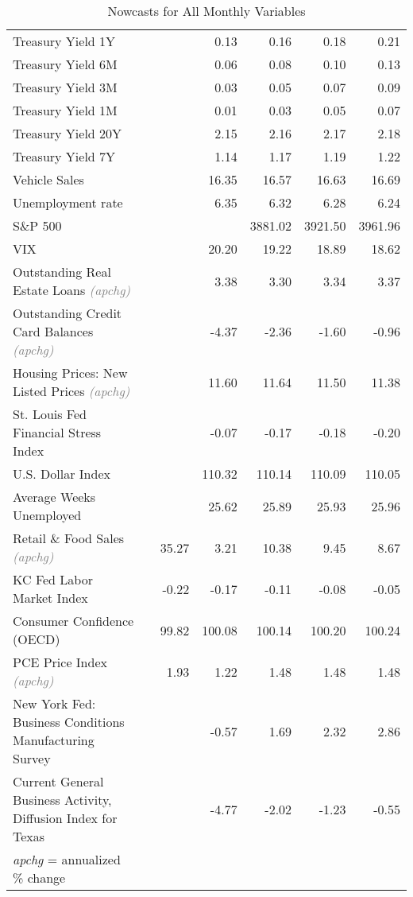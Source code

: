 \documentclass[11pt, letterpaper]{article}\usepackage[]{graphicx}\usepackage[]{color}
\begin{document}
\begin{table}[H]
\begin{tabular}{lrrrrrr}
  Treasury Yield 1Y &  &  & 0.13 & 0.16 & 0.18 & 0.21 \\ 
  Treasury Yield 6M &  &  & 0.06 & 0.08 & 0.10 & 0.13 \\ 
  Treasury Yield 3M &  &  & 0.03 & 0.05 & 0.07 & 0.09 \\ 
  Treasury Yield 1M &  &  & 0.01 & 0.03 & 0.05 & 0.07 \\ 
  Treasury Yield 20Y &  &  & 2.15 & 2.16 & 2.17 & 2.18 \\ 
  Treasury Yield 7Y &  &  & 1.14 & 1.17 & 1.19 & 1.22 \\ 
  Vehicle Sales &  &  & 16.35 & 16.57 & 16.63 & 16.69 \\ 
  Unemployment rate &  &  & 6.35 & 6.32 & 6.28 & 6.24 \\ 
  S\&P 500 &  &  &  & 3881.02 & 3921.50 & 3961.96 \\ 
  VIX &  &  & 20.20 & 19.22 & 18.89 & 18.62 \\ 
  Outstanding Real Estate Loans \textit{\footnotesize\textcolor{gray}{(apchg)}} &  &  & 3.38 & 3.30 & 3.34 & 3.37 \\ 
  Outstanding Credit Card Balances \textit{\footnotesize\textcolor{gray}{(apchg)}} &  &  & -4.37 & -2.36 & -1.60 & -0.96 \\ 
  Housing Prices: New Listed Prices \textit{\footnotesize\textcolor{gray}{(apchg)}} &  &  & 11.60 & 11.64 & 11.50 & 11.38 \\ 
  St. Louis Fed Financial Stress Index &  &  & -0.07 & -0.17 & -0.18 & -0.20 \\ 
  U.S. Dollar Index &  &  & 110.32 & 110.14 & 110.09 & 110.05 \\ 
  Average Weeks Unemployed &  &  & 25.62 & 25.89 & 25.93 & 25.96 \\ 
  Retail \& Food Sales \textit{\footnotesize\textcolor{gray}{(apchg)}} &  & 35.27 & 3.21 & 10.38 & 9.45 & 8.67 \\ 
  KC Fed Labor Market Index &  & -0.22 & -0.17 & -0.11 & -0.08 & -0.05 \\ 
  Consumer Confidence (OECD) &  & 99.82 & 100.08 & 100.14 & 100.20 & 100.24 \\ 
  PCE Price Index \textit{\footnotesize\textcolor{gray}{(apchg)}} &  & 1.93 & 1.22 & 1.48 & 1.48 & 1.48 \\ 
  New York Fed: Business Conditions Manufacturing Survey &  &  & -0.57 & 1.69 & 2.32 & 2.86 \\ 
  Current General Business Activity, Diffusion Index for Texas &  &  & -4.77 & -2.02 & -1.23 & -0.55 \\ 
   \hline 
 \textit{apchg} = annualized \% change 
\end{tabular}
\endgroup
\caption{Nowcasts for All Monthly Variables} 
\end{table}
\end{document}
